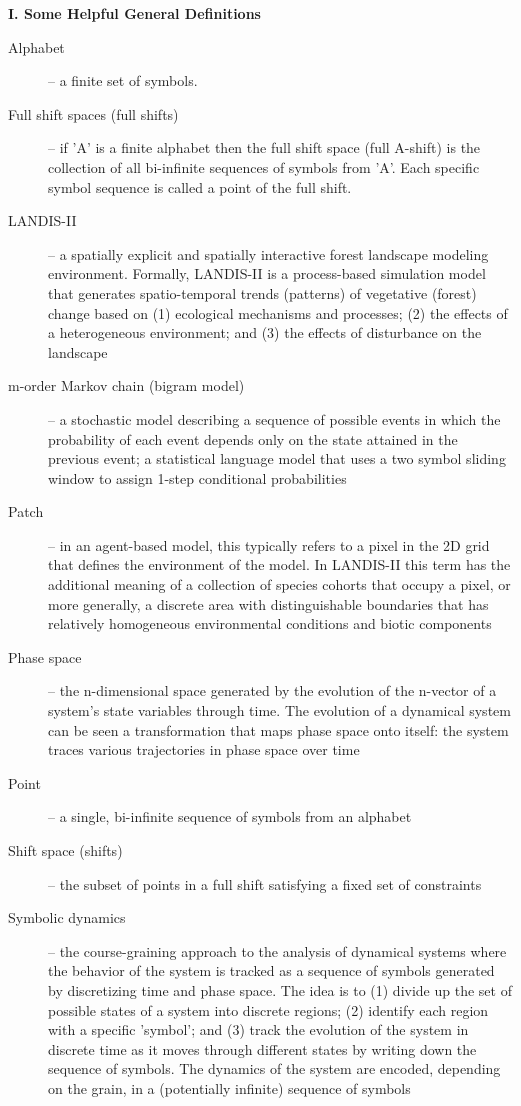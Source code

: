 \documentclass[12pt]{article}
\begin{document}
\centerline{\textbf{I. Some Helpful General Definitions}}
\vspace{-2mm}
\begin{description}
	\item[Alphabet]  -- a finite set of symbols.
	\item[Full shift spaces (full shifts)] -- if 'A' is a finite alphabet then the full shift space (full A-shift) is the collection of all bi-infinite sequences of symbols from 'A'. Each specific symbol sequence is called a point of the full shift.
	\item[LANDIS-II] -- a spatially explicit and spatially interactive forest landscape modeling environment. Formally, LANDIS-II is a process-based simulation model that generates spatio-temporal trends (patterns) of vegetative (forest) change based on	(1) ecological mechanisms and processes; (2) the effects of a heterogeneous environment; and (3) the effects of disturbance on the landscape
	\item[m-order  Markov chain (bigram model)] -- a stochastic model describing a sequence of possible events in which the probability of each event depends only on the state attained in the previous event; a statistical language model that uses a two symbol sliding window to assign 1-step conditional probabilities
	\item[Patch] -- in an agent-based model, this typically refers to a pixel in the 2D grid that defines the environment of the model. In LANDIS-II this term has the additional meaning of a collection of species cohorts that occupy a pixel, or more generally, a discrete area with distinguishable boundaries that has  relatively homogeneous environmental conditions and biotic components
	\item[Phase space] -- the n-dimensional space generated by the evolution of the n-vector of a system's state variables through time. The evolution of a dynamical system can be seen a transformation that maps phase space onto itself: the system traces various trajectories in phase space over time
	\item[Point] -- a single, bi-infinite sequence of symbols from an alphabet
	\item[Shift space (shifts)] -- the subset of points in a full shift satisfying a fixed set of constraints
	\item[Symbolic dynamics] -- the course-graining approach to the analysis of dynamical systems where the behavior of the system is tracked as a sequence of symbols generated by discretizing time and phase space. The idea is to (1) divide up the set of possible states of a system into discrete regions; (2) identify each  region with a specific 'symbol'; and (3) track the evolution of the system in discrete time as it moves through different states by writing down the sequence of symbols. The dynamics of the system are encoded, depending on the grain, in a (potentially infinite) sequence of symbols

\end{description}
\end{document}
